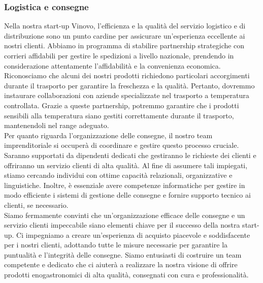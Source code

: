 \documentclass[12pt, a4paper]{article}
\newcommand{\meskip}{\medskip \\}
\begin{document}
\subsubsection{Logistica e consegne}
Nella nostra start-up Vinovo, l'efficienza e la qualità del servizio logistico e di distribuzione sono un punto cardine per assicurare un'esperienza eccellente ai nostri clienti. Abbiamo in programma di stabilire partnership strategiche con corrieri affidabili per gestire le spedizioni a livello nazionale, prendendo in considerazione attentamente l'affidabilità e la convenienza economica.\meskip
Riconosciamo che alcuni dei nostri prodotti richiedono particolari accorgimenti durante il trasporto per garantire la freschezza e la qualità. Pertanto, dovremmo instaurare collaborazioni con aziende specializzate nel trasporto a temperatura controllata. Grazie a queste partnership, potremmo garantire che i prodotti sensibili alla temperatura siano gestiti correttamente durante il trasporto, mantenendoli nel range adeguato.\meskip
Per quanto riguarda l'organizzazione delle consegne, il nostro team imprenditoriale si occuperà di coordinare e gestire questo processo cruciale. Saranno supportati da dipendenti dedicati che gestiranno le richieste dei clienti e offriranno un servizio clienti di alta qualità. Al fine di assumere tali impiegati, stiamo cercando individui con ottime capacità relazionali, organizzative e linguistiche. Inoltre, è essenziale avere competenze informatiche per gestire in modo efficiente i sistemi di gestione delle consegne e fornire supporto tecnico ai clienti, se necessario.\meskip
Siamo fermamente convinti che un'organizzazione efficace delle consegne e un servizio clienti impeccabile siano elementi chiave per il successo della nostra start-up. Ci impegniamo a creare un'esperienza di acquisto piacevole e soddisfacente per i nostri clienti, adottando tutte le misure necessarie per garantire la puntualità e l'integrità delle consegne. Siamo entusiasti di costruire un team competente e dedicato che ci aiuterà a realizzare la nostra visione di offrire prodotti enogastronomici di alta qualità, consegnati con cura e professionalità.
\end{document}
